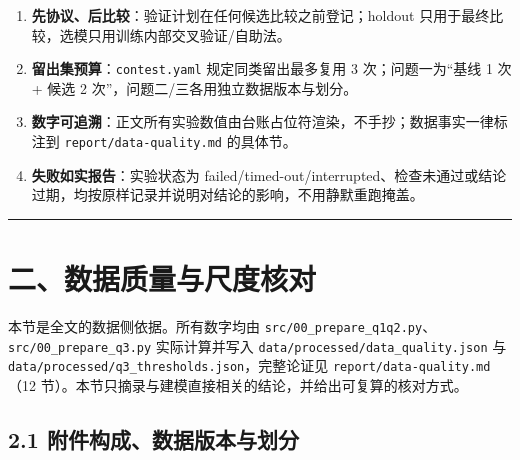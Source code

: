 \documentclass[
  11pt,
]{ctexart}
\providecommand{\tightlist}{%
  \setlength{\itemsep}{0pt}\setlength{\parskip}{0pt}}
\begin{document}
\begin{enumerate}
\def\labelenumi{\arabic{enumi}.}
\tightlist
\item
  \textbf{先协议、后比较}：验证计划在任何候选比较之前登记；holdout
  只用于最终比较，选模只用训练内部交叉验证/自助法。
\item
  \textbf{留出集预算}：\texttt{contest.yaml} 规定同类留出最多复用 3
  次；问题一为``基线 1 次 + 候选 2
  次''，问题二/三各用独立数据版本与划分。
\item
  \textbf{数字可追溯}：正文所有实验数值由台账占位符渲染，不手抄；数据事实一律标注到
  \texttt{report/\allowbreak{}data-quality.\allowbreak{}md} 的具体节。
\item
  \textbf{失败如实报告}：实验状态为
  failed/timed-out/interrupted、检查未通过或结论过期，均按原样记录并说明对结论的影响，不用静默重跑掩盖。
\end{enumerate}

\begin{center}\rule{0.5\linewidth}{0.5pt}\end{center}

\section{二、数据质量与尺度核对}\label{ux4e8cux6570ux636eux8d28ux91cfux4e0eux5c3aux5ea6ux6838ux5bf9}

本节是全文的数据侧依据。所有数字均由
\texttt{src/\allowbreak{}00\_\allowbreak{}prepare\_\allowbreak{}q1q2.\allowbreak{}py}、\texttt{src/\allowbreak{}00\_\allowbreak{}prepare\_\allowbreak{}q3.\allowbreak{}py}
实际计算并写入 \texttt{data/\allowbreak{}processed/\allowbreak{}data\_\allowbreak{}quality.\allowbreak{}json} 与
\texttt{data/\allowbreak{}processed/\allowbreak{}q3\_\allowbreak{}thresholds.\allowbreak{}json}，完整论证见
\texttt{report/\allowbreak{}data-quality.\allowbreak{}md}（12
节）。本节只摘录与建模直接相关的结论，并给出可复算的核对方式。

\subsection{2.1
附件构成、数据版本与划分}\label{ux9644ux4ef6ux6784ux6210ux6570ux636eux7248ux672cux4e0eux5212ux5206}
\end{document}

